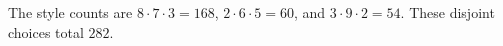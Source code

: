 The style counts are $8\cdot7\cdot3=168$, $2\cdot6\cdot5=60$, and $3\cdot9\cdot2=54$. These disjoint choices total $\boxed{282}$.
